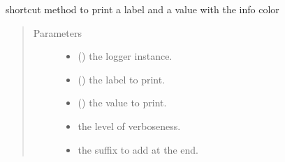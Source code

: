\documentclass[a4paper,10pt,english]{sphinxmanual}
\begin{document}
\begin{fulllineitems}
\label{\detokenize{commands/apidoc/src:src.printcolors.print_value}}
shortcut method to print a label and a value with the info color
\begin{quote}\begin{description}
\item[{Parameters}] \leavevmode\begin{itemize}
\item {} 
 () \textendash{} the logger instance.

\item {} 
 () \textendash{} the label to print.

\item {} 
 () \textendash{} the value to print.

\item {} 
 \textendash{} the level of verboseness.

\item {} 
 \textendash{} the suffix to add at the end.

\end{itemize}

\end{description}\end{quote}

\end{fulllineitems}

\end{document}
